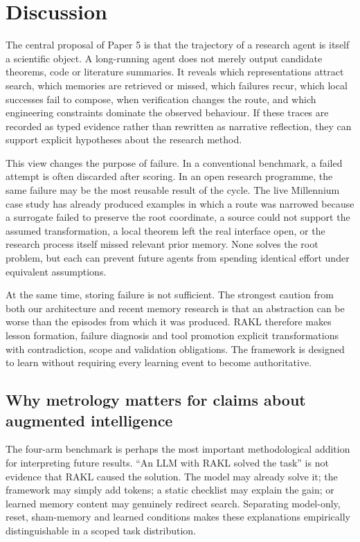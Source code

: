 \section{Discussion}

The central proposal of Paper 5 is that the trajectory of a research agent is itself a scientific object. A long-running agent does not merely output candidate theorems, code or literature summaries. It reveals which representations attract search, which memories are retrieved or missed, which failures recur, which local successes fail to compose, when verification changes the route, and which engineering constraints dominate the observed behaviour. If these traces are recorded as typed evidence rather than rewritten as narrative reflection, they can support explicit hypotheses about the research method.

This view changes the purpose of failure. In a conventional benchmark, a failed attempt is often discarded after scoring. In an open research programme, the same failure may be the most reusable result of the cycle. The live Millennium case study has already produced examples in which a route was narrowed because a surrogate failed to preserve the root coordinate, a source could not support the assumed transformation, a local theorem left the real interface open, or the research process itself missed relevant prior memory. None solves the root problem, but each can prevent future agents from spending identical effort under equivalent assumptions.

At the same time, storing failure is not sufficient. The strongest caution from both our architecture and recent memory research is that an abstraction can be worse than the episodes from which it was produced. RAKL therefore makes lesson formation, failure diagnosis and tool promotion explicit transformations with contradiction, scope and validation obligations. The framework is designed to learn without requiring every learning event to become authoritative.

\subsection{Why metrology matters for claims about augmented intelligence}

The four-arm benchmark is perhaps the most important methodological addition for interpreting future results. ``An LLM with RAKL solved the task'' is not evidence that RAKL caused the solution. The model may already solve it; the framework may simply add tokens; a static checklist may explain the gain; or learned memory content may genuinely redirect search. Separating model-only, reset, sham-memory and learned conditions makes these explanations empirically distinguishable in a scoped task distribution.

